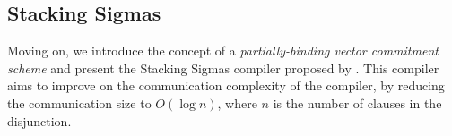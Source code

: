 \subsection{Stacking Sigmas}
Moving on, we introduce the concept of a \emph{partially-binding vector commitment scheme} 
and present the Stacking Sigmas compiler proposed by \cite{StackingSigmas}. This compiler aims to improve on the 
communication complexity of the \cite{CDS94} compiler, by reducing the communication size to $O(\log n)$, where $n$ is the 
number of clauses in the disjunction. 







